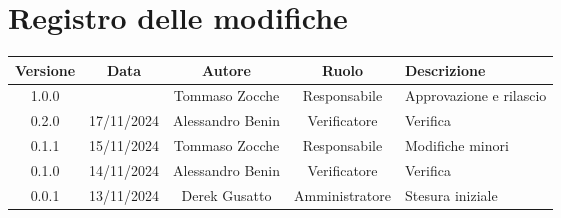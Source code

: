 \section*{Registro delle modifiche}
\begin{table}[H]
    \begin{tabular}{|c|c|c|c|p{3cm}|}
        \hline
        \textbf{Versione} & \textbf{Data} & \textbf{Autore} & \textbf{Ruolo} & \textbf{Descrizione} \\
        \hline
        1.0.0 &  & Tommaso Zocche & Responsabile & Approvazione e rilascio \\
        \hline
        0.2.0 & 17/11/2024 & Alessandro Benin & Verificatore & Verifica \\
        \hline
        0.1.1 & 15/11/2024 & Tommaso Zocche & Responsabile & Modifiche minori \\
        \hline
        0.1.0 & 14/11/2024 & Alessandro Benin & Verificatore & Verifica \\
        \hline
        0.0.1 & 13/11/2024 & Derek Gusatto & Amministratore & Stesura iniziale \\
        \hline
    \end{tabular}
\end{table}
